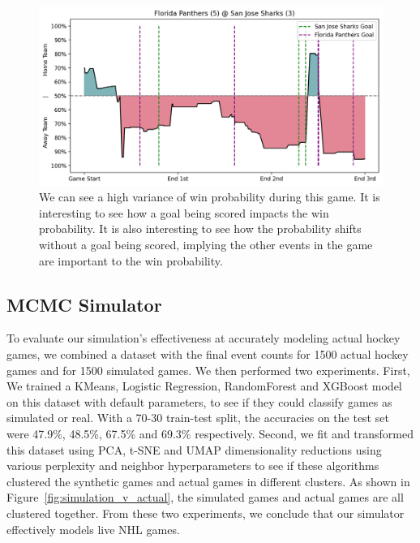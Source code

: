 \documentclass[11pt]{article}
\begin{document}
\begin{figure}
    \centering
    \includegraphics[width=\textwidth]{images/good_xgb_example.png}
    \caption{We can see a high variance of win probability during this game. It is interesting to
    see how a goal being scored impacts the win probability. It is also interesting to see how
    the probability shifts without a goal being scored, implying the other events in the game
    are important to the win probability.}
    \label{fig:xgboost_res}
\end{figure}

\subsection{MCMC Simulator}

To evaluate our simulation's effectiveness at accurately modeling actual hockey 
games, we combined a dataset with the final event counts for 1500 actual hockey 
games and for 1500 simulated games. We then performed two experiments. First, We 
trained a KMeans, Logistic Regression, RandomForest and XGBoost model on this 
dataset with default parameters, to see 
if they could classify games as simulated or real. With a 70-30 train-test split, 
the accuracies on the test set were 47.9\%, 48.5\%, 67.5\% and 69.3\% respectively. 
Second, we fit and transformed this dataset using PCA, t-SNE and UMAP 
dimensionality reductions using various perplexity and neighbor hyperparameters to see 
if these algorithms clustered the synthetic games and actual games in 
different clusters. As shown in Figure~\ref{fig:simulation_v_actual}, the simulated
games and actual games are all clustered together. From these two experiments, we conclude
that our simulator effectively models live NHL games.
\end{document}
